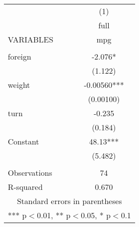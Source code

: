 \documentclass[]{article}
\begin{document}
\begin{tabular}{lc} \hline
 & (1) \\
 & full \\
VARIABLES & mpg \\ \hline
 &  \\
foreign & -2.076* \\
 & (1.122) \\
weight & -0.00560*** \\
 & (0.00100) \\
turn & -0.235 \\
 & (0.184) \\
Constant & 48.13*** \\
 & (5.482) \\
 &  \\
Observations & 74 \\
 R-squared & 0.670 \\ \hline
\multicolumn{2}{c}{ Standard errors in parentheses} \\
\multicolumn{2}{c}{ *** p$<$0.01, ** p$<$0.05, * p$<$0.1} \\
\end{tabular}
\end{document}
